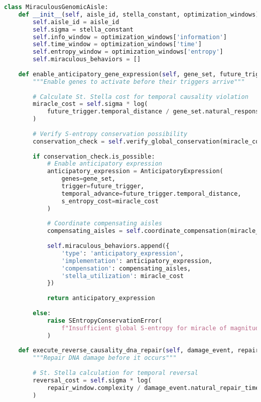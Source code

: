 \documentclass[12pt,a4paper]{article}
\begin{document}
\begin{lstlisting}[language=Python, caption=Practical Miraculous Genomic Implementation, basicstyle=\footnotesize]
class MiraculousGenomicAisle:
    def __init__(self, aisle_id, stella_constant, optimization_windows):
        self.aisle_id = aisle_id
        self.sigma = stella_constant
        self.info_window = optimization_windows['information']
        self.time_window = optimization_windows['time'] 
        self.entropy_window = optimization_windows['entropy']
        self.miraculous_behaviors = []
        
    def enable_anticipatory_gene_expression(self, gene_set, future_trigger):
        """Enable genes to activate before their triggers arrive"""
        
        # Calculate St. Stella cost for temporal causality violation
        miracle_cost = self.sigma * log(
            future_trigger.temporal_distance / gene_set.natural_response_time
        )
        
        # Verify S-entropy conservation possibility
        conservation_check = self.verify_global_conservation(miracle_cost)
        
        if conservation_check.is_possible:
            # Enable anticipatory expression
            anticipatory_expression = AnticipatoryExpression(
                genes=gene_set,
                trigger=future_trigger,
                temporal_advance=future_trigger.temporal_distance,
                s_entropy_cost=miracle_cost
            )
            
            # Coordinate compensating aisles
            compensating_aisles = self.coordinate_compensation(miracle_cost)
            
            self.miraculous_behaviors.append({
                'type': 'anticipatory_expression',
                'implementation': anticipatory_expression,
                'compensation': compensating_aisles,
                'stella_utilization': miracle_cost
            })
            
            return anticipatory_expression
        
        else:
            raise SEntropyConservationError(
                f"Insufficient global S-entropy for miracle of magnitude {miracle_cost}"
            )
    
    def execute_reverse_causality_dna_repair(self, damage_event, repair_window):
        """Repair DNA damage before it occurs"""
        
        # St. Stella calculation for temporal reversal
        reversal_cost = self.sigma * log(
            repair_window.complexity / damage_event.natural_repair_time
        )
        

\end{lstlisting}
\end{document}
